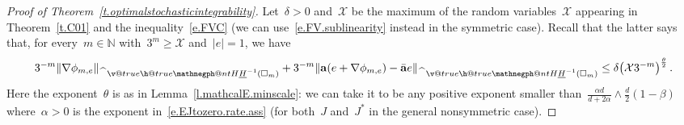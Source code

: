 \documentclass[11pt,twoside]{article} %
\makeatletter
\let\oldsquare\square %
\renewcommand{\square}{\oldsquare}
\numberwithin{equation}{section}
\theoremstyle{definition}
\newcommand*{\N}{\ensuremath{\mathbb{N}}}
\renewcommand*{\hat}{\widehat}
\renewcommand{\a}{\mathbf{a}}
\newcommand{\ahom}{\bar{\a}}
\newcommand{\cu}{\square}
\newcommand{\X}{\mathcal{X}}
\newcommand{\negphantom}{\v@true\h@true\negph@nt}
\newcommand{\negph@nt}{\ifmmode\expandafter\mathpalette 
  \expandafter\mathnegph@nt\else\expandafter\makenegph@nt\fi}
\newcommand{\makenegph@nt}[1]{%
  \setbox\z@\hbox{\color@begingroup#1\color@endgroup}\finnegph@nt}
\newcommand{\finnegph@nt}{%
  \setbox\tw@\null 
  \ifv@ \ht\tw@\ht\z@\dp\tw@\dp\z@\fi \ifh@\wd\tw@-\wd\z@\fi\box\tw@}
\newcommand{\mathnegph@nt}[2]{%
  \setbox\z@\hbox{$\m@th #1{#2}$}\finnegph@nt}
\newcommand{\Hminusul}{\hat{\phantom{H}}\negphantom{H}\underline{H}^{-1}}
\makeatother
\begin{document}
\begin{proof}[Proof of Theorem~\ref{t.optimalstochasticintegrability}]
Let~$\delta>0$ and~$\X$ be the maximum of the random variables~$\X$ appearing in Theorem~\ref{t.C01} and the inequality~\eqref{e.FVC} (we can use~\eqref{e.FV.sublinearity} instead in the symmetric case). 
Recall that the latter says that, for every~$m\in\N$ with~$3^m\geq \X$ and~$|e|=1$, we have  
\begin{equation}
\label{e.FV.sublinearity.again}
3^{-m} \| \nabla \phi_{m,e} \|_{\Hminusul(\cu_m)} 
+
3^{-m} \| \a (e+ \nabla \phi_{m,e}) -\ahom e  \|_{\Hminusul(\cu_m)} 
\leq 
\delta \bigl( \X 3^{-m} \bigr)^{\frac\theta2}
\,.
\end{equation}
Here the exponent~$\theta$ is as in Lemma~\ref{l.mathcalE.minscale}: we can take it to be any positive exponent smaller than~$
\frac{\alpha d}{d+2\alpha} \wedge   \frac d2(1-\beta)$ where~$\alpha>0$ is the exponent in~\eqref{e.EJtozero.rate.ass} (for both~$J$ and~$J^*$ in the general nonsymmetric case). 

\smallskip


\end{proof}
\end{document}
